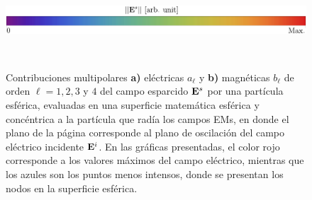 	\begin{figure}[h]\centering
		\includegraphics[scale=.85]{1-Teoria/figs/EsNorm.pdf}\\
		\hspace{-4em}
		\begin{subfigure}{.05\linewidth}\vspace{-3.25cm}\label{figs:ElectricMultipoles} \caption{ } \end{subfigure}
		\hspace{-3em}
		\begin{subfigure}{.9\linewidth}
		\end{subfigure}\\
		\hspace{-4em}	
		\begin{subfigure}{.05\linewidth}\vspace{-3.25cm}\label{figs:MagneticMultipoles} \caption{ } \end{subfigure}
		\hspace{-3em}
		\begin{subfigure}{.9\linewidth}			
		\end{subfigure}
		\caption{Contribuciones multipolares \textbf{a)} eléctricas $a_\ell$ y \textbf{b)} magnéticas $b_\ell$ de orden $\ell = 1,2,3$ y $4$ del campo esparcido $\vb{E}^s$ por una partícula esférica, evaluadas en una superficie matemática esférica y concéntrica a la partícula que radía los campos EMs, en donde el plano de la página corresponde al plano de oscilación del campo eléctrico incidente $\vb{E}^i$. En las gráficas presentadas, el color rojo corresponde a los valores máximos del campo eléctrico, mientras que los azules son los puntos menos intensos, donde se presentan los nodos en la superficie esférica.}
		\label{fig:Multipolos}
	\end{figure}
